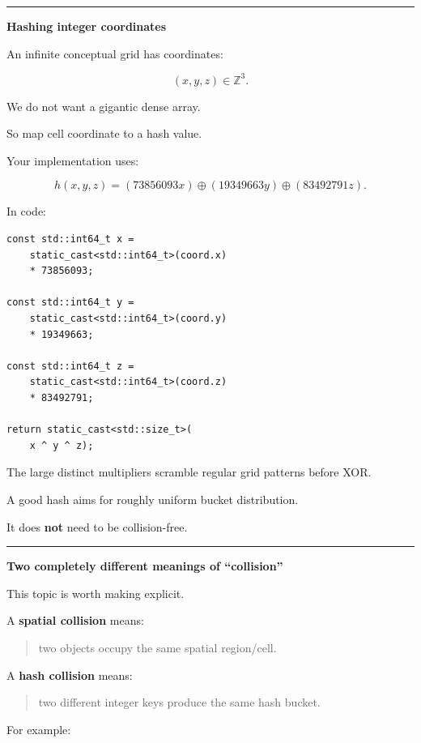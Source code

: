 \begin{center}\rule{0.5\linewidth}{0.5pt}\end{center}

\textbf{Hashing integer coordinates}

An infinite conceptual grid has coordinates:

\[
(x,y,z)\in\mathbb Z^3.
\]

We do not want a gigantic dense array.

So map cell coordinate to a hash value.

Your implementation uses:

\[
h(x,y,z)
=
(73856093x)
\oplus
(19349663y)
\oplus
(83492791z).
\]

In code:

\begin{verbatim}
const std::int64_t x =
    static_cast<std::int64_t>(coord.x)
    * 73856093;

const std::int64_t y =
    static_cast<std::int64_t>(coord.y)
    * 19349663;

const std::int64_t z =
    static_cast<std::int64_t>(coord.z)
    * 83492791;

return static_cast<std::size_t>(
    x ^ y ^ z);
\end{verbatim}

The large distinct multipliers scramble regular grid patterns before XOR.

A good hash aims for roughly uniform bucket distribution.

It does \textbf{not} need to be collision-free.

\begin{center}\rule{0.5\linewidth}{0.5pt}\end{center}

\textbf{Two completely different meanings of ``collision''}

This topic is worth making explicit.

A \textbf{spatial collision} means:

\begin{quote}
two objects occupy the same spatial region/cell.
\end{quote}

A \textbf{hash collision} means:

\begin{quote}
two different integer keys produce the same hash bucket.
\end{quote}

For example:

